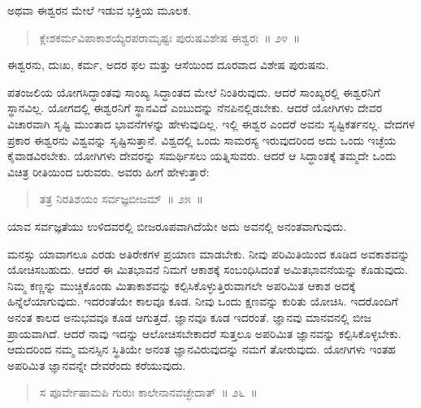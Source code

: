 \vspace{-0.35cm}

ಅಥವಾ ಈಶ್ವರನ ಮೇಲೆ ಇಡುವ ಭಕ್ತಿಯ ಮೂಲಕ. 

\vspace{-0.3cm}

\begin{verse}
ಕ್ಲೇಶಕರ್ಮವಿಪಾಕಾಶಯ್ಯೆರಪರಾಮೃಷ್ಟಃ ಪುರುಷವಿಶೇಷ ಈಶ್ವರಃ~॥ ೨೪~॥
\end{verse}

\vspace{-0.3cm}

ಈಶ್ವರನು, ದುಃಖ, ಕರ್ಮ, ಅದರ ಫಲ ಮತ್ತು ಆಸೆಯಿಂದ ದೂರವಾದ ವಿಶೇಷ ಪುರುಷನು. 

ಪತಂಜಲಿಯ ಯೋಗಸಿದ್ಧಾಂತವು ಸಾಂಖ್ಯ ಸಿದ್ಧಾಂತದ ಮೇಲೆ ನಿಂತಿರುವುದು. ಆದರೆ ಸಾಂಖ್ಯರಲ್ಲಿ ಈಶ್ವರನಿಗೆ ಸ್ಥಾನವಿಲ್ಲ. ಯೋಗದಲ್ಲಿ ಈಶ್ವರನಿಗೆ ಸ್ಥಾನವಿದೆ ಎಂಬುದನ್ನು ನೆನಪಿನಲ್ಲಿಡಬೇಕು. ಆದರೆ ಯೋಗಿಗಳು ದೇವರ ವಿಚಾರವಾಗಿ ಸೃಷ್ಟಿ ಮುಂತಾದ ಭಾವನೆ\break ಗಳನ್ನು ಹೇಳುವುದಿಲ್ಲ. ಇಲ್ಲಿ ಈಶ್ವರ ಎಂದರೆ ಅವನು ಸೃಷ್ಟಿಕರ್ತನಲ್ಲ. ವೇದಗಳ ಪ್ರಕಾರ ಈಶ್ವರನು ವಿಶ್ವವನ್ನು ಸೃಷ್ಟಿಸುತ್ತಾನೆ. ವಿಶ್ವದಲ್ಲಿ ಒಂದು ಸಾಮರಸ್ಯ ಇರುವುದರಿಂದ ಅದು ಒಂದು ಇಚ್ಛೆಯ ಕೈವಾಡವಿರಬೇಕು. ಯೋಗಿಗಳು ದೇವರನ್ನು ಸಮರ್ಥಿಸಲು ಯತ್ನಿಸುವರು. ಆದರೆ ಆ ಸಿದ್ಧಾಂತಕ್ಕೆ ತಮ್ಮದೇ ಒಂದು ವಿಚಿತ್ರ ರೀತಿಯಿಂದ ಬರುವರು. ಅವರು ಹೀಗೆ ಹೇಳುತ್ತಾರೆ:

\vspace{-0.35cm}

\begin{verse}
ತತ್ರ ನಿರತಿಶಯಂ ಸರ್ವಜ್ಞಬೀಜಮ್​~॥ ೨೫~॥
\end{verse}

\vspace{-0.35cm}

ಯಾವ ಸರ್ವಜ್ಞತೆಯು ಉಳಿದವರಲ್ಲಿ ಬೀಜರೂಪವಾಗಿದೆಯೇ ಅದು ಅವನಲ್ಲಿ ಅನಂತವಾಗುವುದು. 

ಮನಸ್ಸು ಯಾವಾಗಲೂ ಎರಡು ಅತಿರೇಕಗಳ ಪ್ರಯಾಣ ಮಾಡಬೇಕು. ನೀವು ಪರಿಮಿತಿಯಿಂದ ಕೂಡಿದ ಅವಕಾಶವನ್ನು ಯೋಚಿಸಬಹುದು. ಆದರೆ ಈ ಮಿತಭಾವನೆ ನಿಮಗೆ ಆಕಾಶಕ್ಕೆ ಸಂಬಂಧಿಸಿದಂತೆ ಅಮಿತಭಾವನೆಯನ್ನು ಕೊಡುವುದು. ನಿಮ್ಮ ಕಣ್ಣನ್ನು ಮುಚ್ಚಿಕೊಂಡು ಮಿತಾಕಾಶವನ್ನು ಕಲ್ಪಿಸಿಕೊಳ್ಳುತ್ತಿರುವಾಗಲೇ ಅಪರಿಮಿತ ಆಕಾಶ ಅದಕ್ಕೆ ಹಿನ್ನೆಲೆಯಾಗುವುದು. ಇದರಂತೆಯೇ ಕಾಲವೂ ಕೂಡ. ನೀವು ಒಂದು ಕ್ಷಣವನ್ನು ಕುರಿತು ಯೋಚಿಸಿ. ಇದರೊಂದಿಗೆ ಅನಂತ ಕಾಲದ ಅನುಭವವೂ ಕೂಡ ಆಗುತ್ತದೆ. ಜ್ಞಾನವೂ ಕೂಡ ಇದರಂತೆ. ಜ್ಞಾನವು ಮಾನವನಲ್ಲಿ ಬೀಜ ಪ್ರಾಯವಾಗಿದೆ. ಆದರೆ ನಾವು ಇದನ್ನು ಆಲೋಚಿಸಬೇಕಾದರೆ ಸುತ್ತಲೂ ಅಪರಿಮಿತ ಜ್ಞಾನವನ್ನು ಕಲ್ಪಿಸಿಕೊಳ್ಳಬೇಕು. ಆದುದರಿಂದ ನಮ್ಮ ಮನಸ್ಸಿನ ಸ್ಥಿತಿಯೇ ಅನಂತ ಜ್ಞಾನವಿರುವುದನ್ನು ನಮಗೆ ತೋರುವುದು. ಯೋಗಿಗಳು ಇಂತಹ ಅಪರಿಮಿತ ಜ್ಞಾನವನ್ನೇ ದೇವರೆಂದು ಕರೆಯುವುದು.

\vspace{-0.4cm}

\begin{verse}
ಸ ಪೂರ್ವೇಷಾಮಪಿ ಗುರುಃ ಕಾಲೇನಾನವಚ್ಛೇದಾತ್​~॥ ೨೬~॥
\end{verse}

